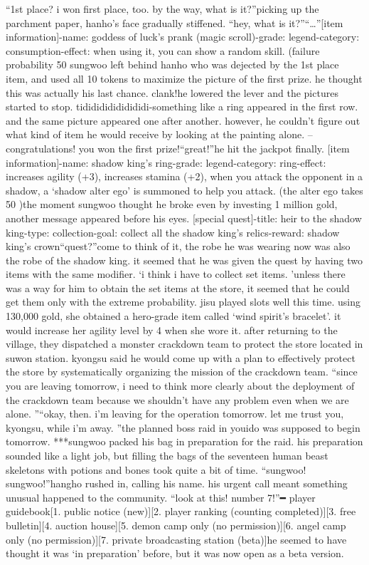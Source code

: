 “1st place? i won first place, too.
 by the way, what is it?”picking up the parchment paper, hanho’s face gradually stiffened.
“hey, what is it?”“…”[item information]-name: goddess of luck’s prank (magic scroll)-grade: legend-category: consumption-effect: when using it, you can show a random skill.
 (failure probability 50%
sungwoo left behind hanho who was dejected by the 1st place item, and used all 10 tokens to maximize the picture of the first prize.
 he thought this was actually his last chance.
clank!he lowered the lever and the pictures started to stop.
tididididididididi-something like a ring appeared in the first row.
 and the same picture appeared one after another.
 however, he couldn’t figure out what kind of item he would receive by looking at the painting alone.
– congratulations! you won the first prize!“great!”he hit the jackpot finally.
[item information]-name: shadow king’s ring-grade: legend-category: ring-effect: increases agility (+3), increases stamina (+2), when you attack the opponent in a shadow, a ‘shadow alter ego’ is summoned to help you attack.
 (the alter ego takes 50%
)the moment sungwoo thought he broke even by investing 1 million gold, another message appeared before his eyes.
[special quest]-title: heir to the shadow king-type: collection-goal: collect all the shadow king’s relics-reward: shadow king’s crown“quest?”come to think of it, the robe he was wearing now was also the robe of the shadow king.
it seemed that he was given the quest by having two items with the same modifier.
‘i think i have to collect set items.
’unless there was a way for him to obtain the set items at the store, it seemed that he could get them only with the extreme probability.
jisu played slots well this time.
 using 130,000 gold, she obtained a hero-grade item called ‘wind spirit’s bracelet’.
 it would increase her agility level by 4 when she wore it.
after returning to the village, they dispatched a monster crackdown team to protect the store located in suwon station.
kyongsu said he would come up with a plan to effectively protect the store by systematically organizing the mission of the crackdown team.
“since you are leaving tomorrow, i need to think more clearly about the deployment of the crackdown team because we shouldn’t have any problem even when we are alone.
”“okay, then.
 i’m leaving for the operation tomorrow.
 let me trust you, kyongsu, while i’m away.
”the planned boss raid in youido was supposed to begin tomorrow.
***sungwoo packed his bag in preparation for the raid.
 his preparation sounded like a light job, but filling the bags of the seventeen human beast skeletons with potions and bones took quite a bit of time.
“sungwoo! sungwoo!”hangho rushed in, calling his name.
 his urgent call meant something unusual happened to the community.
“look at this! number 7!”━ player guidebook[1.
 public notice (new)][2.
 player ranking (counting completed)][3.
 free bulletin][4.
 auction house][5.
 demon camp only (no permission)][6.
 angel camp only (no permission)][7.
 private broadcasting station (beta)]he seemed to have thought it was ‘in preparation’ before, but it was now open as a beta version.


